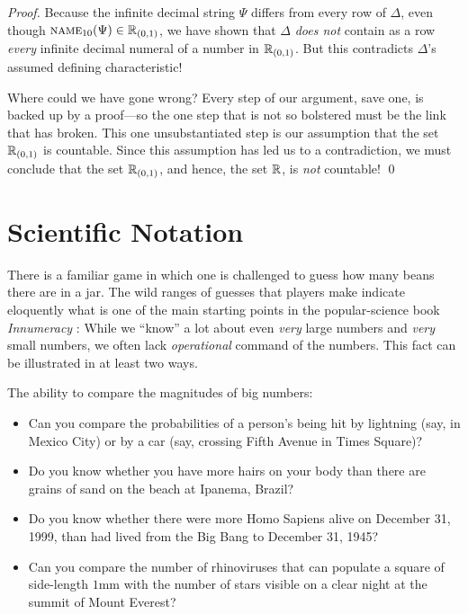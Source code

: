 \begin{proof}
Because the infinite decimal string $\Psi$ differs from every row of
$\Delta$, even though $\mbox{\sc name}_{10}(\Psi) \in \mathbb{R}_{(0,1)}$, we
have shown that $\Delta$ {\em does not} contain as a row {\em every}
infinite decimal numeral of a number in $\mathbb{R}_{(0,1)}$.  But this
contradicts $\Delta$'s assumed defining characteristic!

Where could we have gone wrong?  Every step of our argument, save one,
is backed up by a proof---so the one step that is not so bolstered
must be the link that has broken.  This one unsubstantiated step is
our assumption that the set $\mathbb{R}_{(0,1)}$ is countable.  Since this
assumption has led us to a contradiction, we must conclude that the
set $\mathbb{R}_{(0,1)}$, and hence, the set $\mathbb{R}$, is {\em not} countable!  \qed
\end{proof}



\section{Scientific Notation}
\label{sec:scientific-notation}

There is a familiar game in which one is challenged to guess how many
beans there are in a jar. The wild ranges of guesses that players make
indicate eloquently what is one of the main starting points in the
popular-science book {\it Innumeracy} \cite{Paulos}: While we ``know''
a lot about even {\em very} large numbers and {\em very} small
numbers, we often lack {\em operational} command of the numbers.  This
fact can be illustrated in at least two ways.

The ability to compare the magnitudes of big numbers:
\begin{itemize}
\item
Can you compare the probabilities of a person's being hit by lightning
(say, in Mexico City) or by a car (say, crossing Fifth Avenue in Times
Square)?
\item
Do you know whether you have more hairs on your body than there are
grains of sand on the beach at Ipanema, Brazil?
\item

Do you know whether there were more Homo Sapiens alive on December 31,
1999, than had lived from the Big Bang to December 31, 1945?
\item
Can you compare the number of rhinoviruses that can populate a square
of side-length $1$mm with the number of stars visible on a clear night
at the summit of Mount Everest?
\end{itemize}

